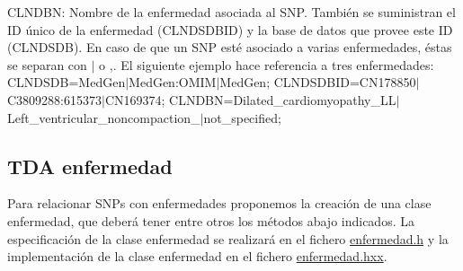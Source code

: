 \begin{DoxyItemize}
\begin{DoxyItemize}
\item C\+L\+N\+D\+BN\+: Nombre de la enfermedad asociada al S\+NP. También se suministran el ID único de la enfermedad (C\+L\+N\+D\+S\+D\+B\+ID) y la base de datos que provee este ID (C\+L\+N\+D\+S\+DB). En caso de que un S\+NP esté asociado a varias enfermedades, éstas se separan con \textquotesingle{}$\vert$\textquotesingle{} o \textquotesingle{},\textquotesingle{}. El siguiente ejemplo hace referencia a tres enfermedades\+: C\+L\+N\+D\+S\+DB=Med\+Gen$\vert$\+Med\+Gen\+:O\+M\+I\+M$\vert$\+Med\+Gen; C\+L\+N\+D\+S\+D\+B\+ID=C\+N178850$\vert$\+C3809288\+:615373$\vert$\+C\+N169374; C\+L\+N\+D\+BN=Dilated\+\_\+cardiomyopathy\+\_\+L\+L$\vert$\+Left\+\_\+ventricular\+\_\+noncompaction\+\_$\vert$not\+\_\+specified;
\end{DoxyItemize}\end{DoxyItemize}
\hypertarget{index_enfermedad}{}\subsection{T\+D\+A enfermedad}\label{index_enfermedad}
Para relacionar S\+N\+Ps con enfermedades proponemos la creación de una clase enfermedad, que deberá tener entre otros los métodos abajo indicados. La especificación de la clase enfermedad se realizará en el fichero \hyperlink{enfermedad_8h}{enfermedad.\+h} y la implementación de la clase enfermedad en el fichero \hyperlink{enfermedad_8hxx}{enfermedad.\+hxx}.


